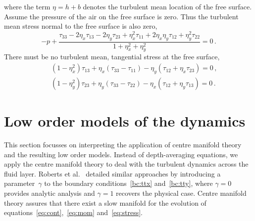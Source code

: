 \documentclass[a5paper,12pt]{article}
\begin{document}
where the term $\eta=h+b$ denotes the turbulent mean location of the free surface. Assume the pressure of the air on the free surface is zero. 
Thus the turbulent mean stress normal to the free surface is also zero,
\begin{equation}
    -p+\frac{\tau_{33} -2\eta_x\tau_{13} -2\eta_y\tau_{23}
    +\eta_x^2\tau_{11} +2\eta_x\eta_y\tau_{12}+\eta_y^2\tau_{22}}
    {1+\eta_x^2+\eta_y^2}
     =0\,.
    \label{bc:ttz}
\end{equation}
There must be no turbulent mean, tangential stress at the free surface,
\begin{eqnarray}&&
    (1-\eta_x^2)\tau_{13}+\eta_x(\tau_{33}-\tau_{11})-\eta_y(\tau_{12}+\eta_x\tau_{23})=0\,,
    \label{bc:ttx} \\&&
    (1-\eta_y^2)\tau_{23}+\eta_y(\tau_{33}-\tau_{22})
    -\eta_x(\tau_{12}+\eta_y\tau_{13})=0\,.
    \label{bc:tty}
\end{eqnarray}




\section{Low order models of the dynamics}

This section focusses on interpreting the application of centre manifold theory and the resulting low order models.
Instead of depth-averaging equations, we apply the centre manifold theory to deal with the turbulent dynamics across the fluid layer. 
Roberts et al.~\cite{Roberts2008,Georgiev2008} detailed similar approaches by introducing a parameter~$\gamma$ to the boundary conditions~\eqref{bc:ttx} and~\eqref{bc:tty}, where $\gamma=0$ provides analytic analysis and $\gamma=1$ recovers the physical case. 
Centre manifold theory assures that there exist a slow manifold for the evolution of equations~\eqref{eq:cont},~\eqref{eq:mom} and~\eqref{eq:stress}.
 
\end{document}
